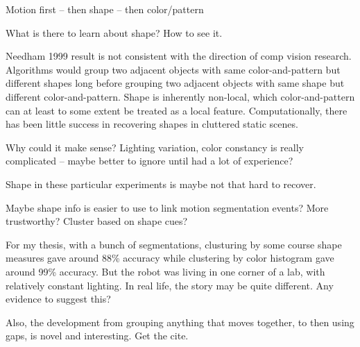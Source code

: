 Motion first -- then shape -- then color/pattern

What is there to learn about shape?  How to see it.

Needham 1999 result is not consistent with the direction of comp
vision research.  Algorithms would group two adjacent objects with
same color-and-pattern but different shapes long before grouping two
adjacent objects with same shape but different color-and-pattern.
Shape is inherently non-local, which color-and-pattern 
can at least to some extent be treated as a local feature.
Computationally, there 
has been little success in recovering shapes in cluttered static scenes.

Why could it make sense?  Lighting variation, color constancy is
really complicated -- maybe better to ignore until had a lot
of experience?

Shape in these particular experiments is maybe not that hard to
recover.

Maybe shape info is easier to use to link motion segmentation
events?  More trustworthy?  Cluster based on shape cues?

For my thesis, with a bunch of segmentations, clusturing by
some course shape measures gave around 88\% accuracy while
clustering by color histogram gave around 99\% accuracy.
But the robot was living in one corner of a lab, with 
relatively constant lighting.  In real life, the story may
be quite different.  Any evidence to suggest this?

Also, the development from grouping anything that moves
together, to then using gaps, is novel and interesting.
Get the cite.

